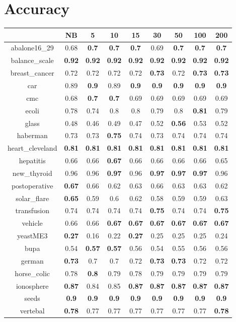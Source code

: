 \documentclass{article}%
\begin{document}
%
\normalsize%
\section*{Accuracy}%
\begin{tabular}{c|cccccccc}%
\hline%
&NB&5&10&15&30&50&100&200\\%
\hline%
abalone16\_29&0.68&\textbf{0.7}&\textbf{0.7}&\textbf{0.7}&0.69&\textbf{0.7}&\textbf{0.7}&\textbf{0.7}\\%
\hline%
balance\_scale&\textbf{0.92}&\textbf{0.92}&\textbf{0.92}&\textbf{0.92}&\textbf{0.92}&\textbf{0.92}&\textbf{0.92}&\textbf{0.92}\\%
\hline%
breast\_cancer&0.72&0.72&0.72&0.72&\textbf{0.73}&0.72&\textbf{0.73}&\textbf{0.73}\\%
\hline%
car&0.89&\textbf{0.9}&0.89&\textbf{0.9}&\textbf{0.9}&\textbf{0.9}&\textbf{0.9}&\textbf{0.9}\\%
\hline%
cmc&0.68&\textbf{0.7}&\textbf{0.7}&0.69&0.69&0.69&0.69&0.69\\%
\hline%
ecoli&0.78&0.74&0.8&0.8&0.79&0.8&\textbf{0.81}&0.79\\%
\hline%
glass&0.48&0.46&0.49&0.47&0.52&\textbf{0.56}&0.53&0.52\\%
\hline%
haberman&0.73&0.73&\textbf{0.75}&0.74&0.73&0.74&0.74&0.74\\%
\hline%
heart\_cleveland&\textbf{0.81}&\textbf{0.81}&\textbf{0.81}&\textbf{0.81}&\textbf{0.81}&\textbf{0.81}&\textbf{0.81}&\textbf{0.81}\\%
\hline%
hepatitis&0.66&0.66&\textbf{0.67}&0.66&0.66&0.66&0.66&0.65\\%
\hline%
new\_thyroid&0.96&0.96&\textbf{0.97}&0.96&\textbf{0.97}&\textbf{0.97}&\textbf{0.97}&0.96\\%
\hline%
postoperative&\textbf{0.67}&0.66&0.62&0.63&0.66&0.63&0.63&0.62\\%
\hline%
solar\_flare&\textbf{0.65}&0.59&0.6&0.62&0.58&0.59&0.59&0.63\\%
\hline%
transfusion&0.74&0.74&0.74&0.74&\textbf{0.75}&0.74&0.74&\textbf{0.75}\\%
\hline%
vehicle&0.66&0.66&\textbf{0.67}&\textbf{0.67}&\textbf{0.67}&\textbf{0.67}&\textbf{0.67}&\textbf{0.67}\\%
\hline%
yeastME3&\textbf{0.27}&0.16&0.22&\textbf{0.27}&0.25&0.25&0.25&0.24\\%
\hline%
bupa&0.54&\textbf{0.57}&\textbf{0.57}&0.56&0.54&0.55&0.56&0.56\\%
\hline%
german&\textbf{0.73}&0.7&0.7&0.72&\textbf{0.73}&\textbf{0.73}&0.72&0.72\\%
\hline%
horse\_colic&0.78&\textbf{0.8}&0.79&0.78&0.79&0.79&0.79&0.79\\%
\hline%
ionosphere&\textbf{0.87}&0.84&0.85&\textbf{0.87}&\textbf{0.87}&\textbf{0.87}&\textbf{0.87}&\textbf{0.87}\\%
\hline%
seeds&\textbf{0.9}&\textbf{0.9}&\textbf{0.9}&\textbf{0.9}&\textbf{0.9}&\textbf{0.9}&\textbf{0.9}&\textbf{0.9}\\%
\hline%
vertebal&\textbf{0.78}&0.77&0.77&0.77&0.77&0.77&0.77&\textbf{0.78}\\%
\hline%
\end{tabular}
\end{document}
